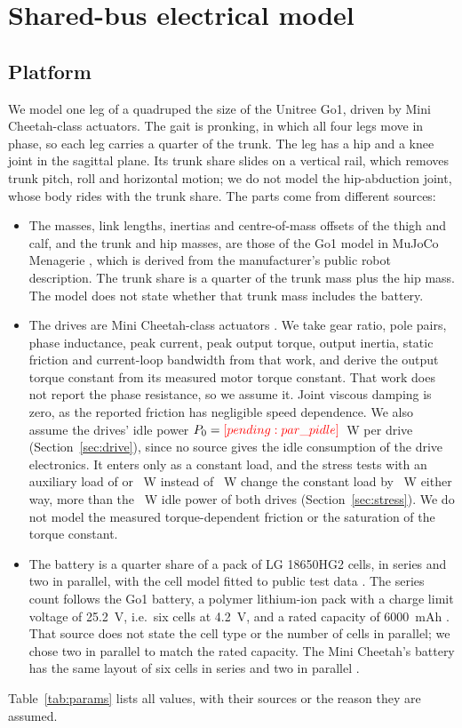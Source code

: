 \section{Shared-bus electrical model}\label{sec:model}
\subsection{Platform}
We model one leg of a quadruped the size of the Unitree Go1, driven by Mini Cheetah-class actuators. The gait is pronking, in which all four legs move in phase, so each leg carries a quarter of the trunk. The leg has a hip and a knee joint in the sagittal plane. Its trunk share slides on a vertical rail, which removes trunk pitch, roll and horizontal motion; we do not model the hip-abduction joint, whose body rides with the trunk share. The parts come from different sources:
\begin{itemize}
\item The masses, link lengths, inertias and centre-of-mass offsets of the thigh and calf, and the trunk and hip masses, are those of the Go1 model in MuJoCo Menagerie \cite{zakka2022menagerie}, which is derived from the manufacturer's public robot description. The trunk share is a quarter of the trunk mass plus the hip mass. The model does not state whether that trunk mass includes the battery.
\item The drives are Mini Cheetah-class actuators \cite{katz2018actuator}. We take gear ratio, pole pairs, phase inductance, peak current, peak output torque, output inertia, static friction and current-loop bandwidth from that work, and derive the output torque constant from its measured motor torque constant. That work does not report the phase resistance, so we assume it. Joint viscous damping is zero, as the reported friction has negligible speed dependence. We also assume the drives' idle power $P_0=\res{par_pidle}$~W per drive (Section~\ref{sec:drive}), since no source gives the idle consumption of the drive electronics. It enters only as a constant load, and the stress tests with an auxiliary load of  or ~W instead of ~W change the constant load by ~W either way, more than the ~W idle power of both drives (Section~\ref{sec:stress}). We do not model the measured torque-dependent friction or the saturation of the torque constant.
\item The battery is a quarter share of a pack of LG 18650HG2 cells,  in series and two in parallel, with the cell model fitted to public test data \cite{kollmeyer2020hg2}. The series count follows the Go1 battery, a polymer lithium-ion pack with a charge limit voltage of 25.2~V, i.e.\ six cells at 4.2~V, and a rated capacity of 6000~mAh \cite{unitree2026go1battery}. That source does not state the cell type or the number of cells in parallel; we chose two in parallel to match the rated capacity. The Mini Cheetah's battery has the same layout of six cells in series and two in parallel \cite{katz2018actuator}.
\end{itemize}
Table~\ref{tab:params} lists all values, with their sources or the reason they are assumed.

